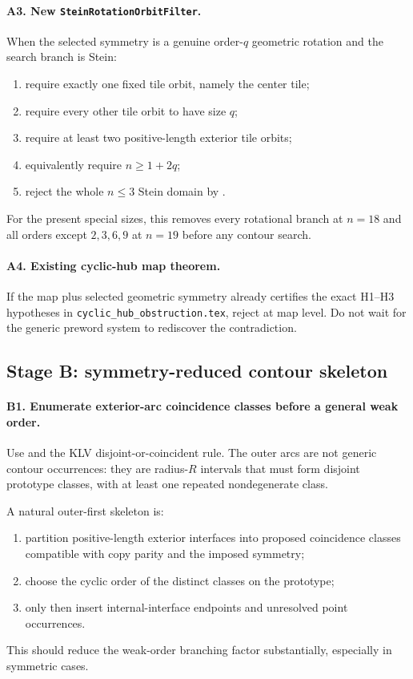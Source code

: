 \documentclass[11pt]{article}
\theoremstyle{definition}
\theoremstyle{remark}
\begin{document}
\paragraph{A3. New \texttt{SteinRotationOrbitFilter}.}
When the selected symmetry is a genuine order-$q$ geometric rotation and the search branch is Stein:
\begin{enumerate}
\item require exactly one fixed tile orbit, namely the center tile;
\item require every other tile orbit to have size $q$;
\item require at least two positive-length exterior tile orbits;
\item equivalently require $n\ge1+2q$;
\item reject the whole $n\le3$ Stein domain by \cite{KLV2020}.
\end{enumerate}
For the present special sizes, this removes every rotational branch at $n=18$ and all orders except $2,3,6,9$ at $n=19$ before any contour search.

\paragraph{A4. Existing cyclic-hub map theorem.}
If the map plus selected geometric symmetry already certifies the exact H1--H3 hypotheses in \texttt{cyclic\_hub\_obstruction.tex}, reject at map level.  Do not wait for the generic preword system to rediscover the contradiction.

\subsection{Stage B: symmetry-reduced contour skeleton}

\paragraph{B1. Enumerate exterior-arc coincidence classes before a general weak order.}
Use  and the KLV disjoint-or-coincident rule.  The outer arcs are not generic contour occurrences: they are radius-$R$ intervals that must form disjoint prototype classes, with at least one repeated nondegenerate class.

A natural outer-first skeleton is:
\begin{enumerate}
\item partition positive-length exterior interfaces into proposed coincidence classes compatible with copy parity and the imposed symmetry;
\item choose the cyclic order of the distinct classes on the prototype;
\item only then insert internal-interface endpoints and unresolved point occurrences.
\end{enumerate}
This should reduce the weak-order branching factor substantially, especially in symmetric cases.
\end{document}
